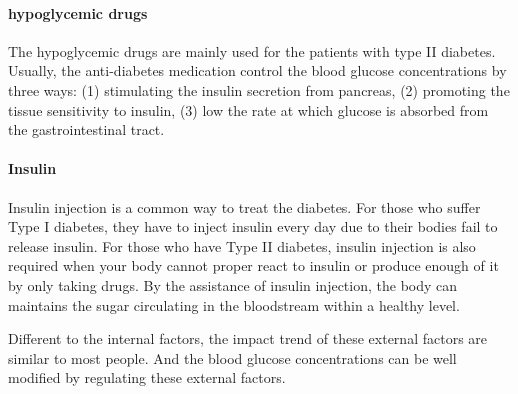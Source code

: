 \paragraph{hypoglycemic drugs} The hypoglycemic drugs are mainly used for the patients with type II diabetes\cite{bib:eurich2007benefits,bib:jung2006antidiabetic,bib:patel2012overview}. Usually, the anti-diabetes medication control the blood glucose concentrations by three ways: (1) stimulating the insulin secretion from pancreas, (2) promoting the tissue sensitivity to insulin, (3) low the rate at which glucose is absorbed from the gastrointestinal tract.

\paragraph{Insulin} Insulin injection is a common way to treat the diabetes. For those who suffer Type I diabetes, they have to inject insulin every day due to their bodies fail to release insulin. For those who have Type II diabetes, insulin injection is also required when your body cannot proper react to insulin or produce enough of it by only taking drugs. By the assistance of insulin injection, the body can maintains the sugar circulating in the bloodstream within a healthy level.

Different to the internal factors, the impact trend of these external factors are similar to most people. And the blood glucose concentrations can be well modified by regulating these external factors.
